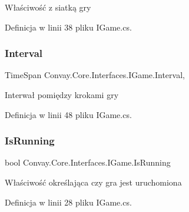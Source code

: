 Właściwość z siatką gry 



Definicja w linii 38 pliku I\+Game.\+cs.

\hypertarget{interface_convay_1_1_core_1_1_interfaces_1_1_i_game_ac983ad8ffbfd959d5ba7f37f614c8a5c}{}\label{interface_convay_1_1_core_1_1_interfaces_1_1_i_game_ac983ad8ffbfd959d5ba7f37f614c8a5c} 
\subsubsection{\texorpdfstring{Interval}{Interval}}
{\footnotesize\ttfamily Time\+Span Convay.\+Core.\+Interfaces.\+I\+Game.\+Interval\hspace{0.3cm}{\ttfamily [get]}, {\ttfamily [set]}}



Interwał pomiędzy krokami gry 



Definicja w linii 48 pliku I\+Game.\+cs.

\hypertarget{interface_convay_1_1_core_1_1_interfaces_1_1_i_game_a3757d3d601006324fffb3f50296c0222}{}\label{interface_convay_1_1_core_1_1_interfaces_1_1_i_game_a3757d3d601006324fffb3f50296c0222} 
\subsubsection{\texorpdfstring{Is\+Running}{IsRunning}}
{\footnotesize\ttfamily bool Convay.\+Core.\+Interfaces.\+I\+Game.\+Is\+Running\hspace{0.3cm}{\ttfamily [get]}}



Właściwość określająca czy gra jest uruchomiona 



Definicja w linii 28 pliku I\+Game.\+cs.

\hypertarget{interface_convay_1_1_core_1_1_interfaces_1_1_i_game_a436757764168b56113bd693f7f15fc72}{}\label{interface_convay_1_1_core_1_1_interfaces_1_1_i_game_a436757764168b56113bd693f7f15fc72} 
